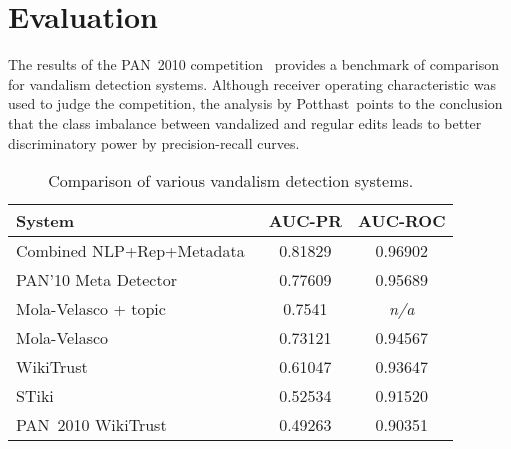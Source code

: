 \section{Evaluation}

The results of the PAN~2010 competition~\cite{Potthast2010b}
provides a benchmark of comparison for vandalism detection systems.
Although receiver operating characteristic was used to judge the
competition, the analysis by Potthast~\etal points to the conclusion
that the class imbalance between vandalized and regular edits
leads to better discriminatory power by precision-recall curves.


\begin{table}[tbhp]
    \begin{center}
        \begin{tabular}{|l|c|c|}
\hline
\textbf{System} & \textbf{AUC-PR} & \textbf{AUC-ROC} \\
\hline
\hline
Combined NLP+Rep+Metadata~\cite{Adler2011a} & 0.81829 & 0.96902 \\
PAN'10 Meta Detector~\cite{Potthast2010b} & 0.77609 & 0.95689 \\
Mola-Velasco + topic~\cite{Mola2011} & 0.7541 & \textit{n/a} \\
Mola-Velasco~\cite{Adler2011a} & 0.73121 & 0.94567 \\
WikiTrust~\cite{Adler2011a} & 0.61047 & 0.93647 \\
STiki~\cite{Adler2011a} & 0.52534 & 0.91520 \\
PAN~2010 WikiTrust~\cite{Potthast2010b} & 0.49263 & 0.90351 \\
\hline
        \end{tabular}
    \end{center}
    \caption{Comparison of various vandalism detection systems.}
\end{table}
